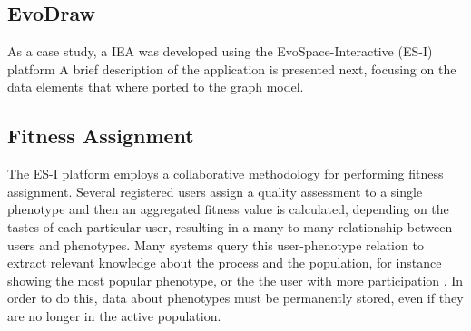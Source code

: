 \subsection{EvoDraw}
As a case study, a IEA was developed using the 
EvoSpace-Interactive (ES-I) platform \cite{garcia2013evospace}
A brief description of the application is presented next, focusing
on the data elements that where ported to the graph model.

\subsection{Fitness Assignment}
\label{sec:assignment}
The ES-I %
 platform employs a collaborative methodology for performing fitness
 assignment. Several registered users assign a quality assessment to a single
phenotype and then an aggregated fitness value is calculated,
depending on the tastes of each particular user,  %
resulting in a many-to-many relationship between users and
phenotypes. %
Many systems %
query this user-phenotype relation to extract relevant
knowledge about the process and the population, for instance showing the
most popular phenotype, or the the user with more participation 
\cite{picbreeder}.
In order to do this, data about phenotypes %
must be permanently stored, even
if they are no longer in the active population. 

